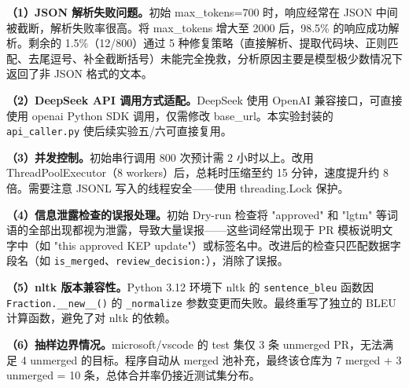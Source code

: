 \documentclass{experimentreport}
\begin{document}
{\textbf{（1）JSON 解析失败问题。}初始 max\_tokens=700 时，响应经常在 JSON 中间被截断，解析失败率很高。将 max\_tokens 增大至 2000 后，98.5\% 的响应成功解析。剩余的 1.5\%（12/800）通过 5 种修复策略（直接解析、提取代码块、正则匹配、去尾逗号、补全截断括号）未能完全挽救，分析原因主要是模型极少数情况下返回了非 JSON 格式的文本。

\textbf{（2）DeepSeek API 调用方式适配。}DeepSeek 使用 OpenAI 兼容接口，可直接使用 openai Python SDK 调用，仅需修改 base\_url。本实验封装的 \texttt{api\_caller.py} 使后续实验五/六可直接复用。

\textbf{（3）并发控制。}初始串行调用 800 次预计需 2 小时以上。改用 ThreadPoolExecutor（8 workers）后，总耗时压缩至约 15 分钟，速度提升约 8 倍。需要注意 JSONL 写入的线程安全——使用 threading.Lock 保护。

\textbf{（4）信息泄露检查的误报处理。}初始 Dry-run 检查将 "approved" 和 "lgtm" 等词语的全部出现都视为泄露，导致大量误报——这些词经常出现于 PR 模板说明文字中（如 "this approved KEP update"）或标签名中。改进后的检查只匹配数据字段名（如 \texttt{is\_merged}、\texttt{review\_decision:}），消除了误报。

\textbf{（5）nltk 版本兼容性。}Python 3.12 环境下 nltk 的 \texttt{sentence\_bleu} 函数因 \texttt{Fraction.\_\_new\_\_()} 的 \texttt{\_normalize} 参数变更而失败。最终重写了独立的 BLEU 计算函数，避免了对 nltk 的依赖。

\textbf{（6）抽样边界情况。}microsoft/vscode 的 test 集仅 3 条 unmerged PR，无法满足 4 unmerged 的目标。程序自动从 merged 池补充，最终该仓库为 7 merged + 3 unmerged = 10 条，总体合并率仍接近测试集分布。

}

\end{document}
